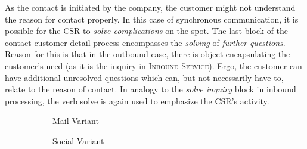 	 As the contact is initiated by the company, the customer might not understand the reason for contact properly. In this case of synchronous communication, it is possible for the \acrshort{CSR} to\textit{ solve complications} on the spot. The last block of the contact customer detail process encompasses the \textit{solving} of \textit{further} \textit{questions}. Reason for this is that in the outbound case, there is object encapsulating the customer's need (as it is the inquiry in \textsc{Inbound Service}). Ergo, the customer can have additional unresolved questions which can, but not necessarily have to, relate to the reason of contact. In analogy to the \textit{solve inquiry} block in inbound processing, the verb solve is again used to emphasize the \acrshort{CSR}'s activity. 
	 
	 
	 \begin{figure}[caption={Contact Customer Detail Process}, label={fig:outbound:con}]
	 	
	 	\begin{subfigure}[b]{.45\textwidth}
	 		\centering
	 		
	 		\caption{Mail Variant}\label{fig:outbound:con:mail}
	 	\end{subfigure}
	 	\begin{subfigure}[b]{.45\textwidth}
	 		\centering	
	 		\caption{Social Variant}\label{fig:outbound:con:social}
	 	\end{subfigure}
	 	\begin{subfigure}[b]{.45\textwidth}
	 		\centering	
\end{subfigure}
\end{figure}
